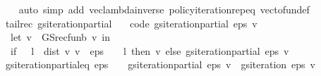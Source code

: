 \begin{isabellebody}
%
\isadelimproof
\ \ %
\endisadelimproof
%
\isatagproof
{}\isamarkupfalse%
\ {\isacharparenleft}{\kern0pt}auto\ simp\ add{\isacharcolon}{\kern0pt}\ vec{\isacharunderscore}{\kern0pt}lambda{\isacharunderscore}{\kern0pt}inverse\ policy{\isacharunderscore}{\kern0pt}iteration{\isacharprime}{\kern0pt}{\isachardot}{\kern0pt}rep{\isacharunderscore}{\kern0pt}eq\ vec{\isacharunderscore}{\kern0pt}to{\isacharunderscore}{\kern0pt}fun{\isacharunderscore}{\kern0pt}def{\isacharparenright}{\kern0pt}%
\endisatagproof
{\isafoldproof}%
%
\isadelimproof
%
\endisadelimproof
%
\isadelimdocument
%
\endisadelimdocument
%
\isatagdocument
%
\isamarkuptrue%
%
\endisatagdocument
{\isafolddocument}%
%
\isadelimdocument
%
\endisadelimdocument
{}\isamarkupfalse%
\ {\isacharparenleft}{\kern0pt}tailrec{\isacharparenright}{\kern0pt}\ gs{\isacharunderscore}{\kern0pt}iteration{\isacharunderscore}{\kern0pt}partial\ \isanewline
\ \ {\isacharbrackleft}{\kern0pt}code{\isacharbrackright}{\kern0pt}{\isacharcolon}{\kern0pt}\ {\isachardoublequoteopen}gs{\isacharunderscore}{\kern0pt}iteration{\isacharunderscore}{\kern0pt}partial\ eps\ v\ {\isacharequal}{\kern0pt}\ {\isacharparenleft}{\kern0pt}\isanewline
\ \ let\ v{\isacharprime}{\kern0pt}\ {\isacharequal}{\kern0pt}\ {\isacharparenleft}{\kern0pt}GS{\isacharunderscore}{\kern0pt}rec{\isacharunderscore}{\kern0pt}fun\isactrlsub b\ v{\isacharparenright}{\kern0pt}\ in\ \isanewline
\ \ {\isacharparenleft}{\kern0pt}if\ {}\ {\isacharasterisk}{\kern0pt}\ l\ {\isacharasterisk}{\kern0pt}\ dist\ v\ v{\isacharprime}{\kern0pt}\ {\isacharless}{\kern0pt}\ eps\ {\isacharasterisk}{\kern0pt}\ {\isacharparenleft}{\kern0pt}{}\ {\isacharminus}{\kern0pt}\ l{\isacharparenright}{\kern0pt}\ then\ v{\isacharprime}{\kern0pt}\ else\ gs{\isacharunderscore}{\kern0pt}iteration{\isacharunderscore}{\kern0pt}partial\ eps\ v{\isacharprime}{\kern0pt}{\isacharparenright}{\kern0pt}{\isacharparenright}{\kern0pt}{\isachardoublequoteclose}\isanewline
\isanewline
{}\isamarkupfalse%
\ gs{\isacharunderscore}{\kern0pt}iteration{\isacharunderscore}{\kern0pt}partial{\isacharunderscore}{\kern0pt}eq{\isacharcolon}{\kern0pt}\ {\isachardoublequoteopen}eps\ {\isachargreater}{\kern0pt}\ {}\ {\isasymLongrightarrow}\ gs{\isacharunderscore}{\kern0pt}iteration{\isacharunderscore}{\kern0pt}partial\ eps\ v\ {\isacharequal}{\kern0pt}\ gs{\isacharunderscore}{\kern0pt}iteration\ eps\ v{\isachardoublequoteclose}\isanewline
%
\isadelimproof

\end{isabellebody}
